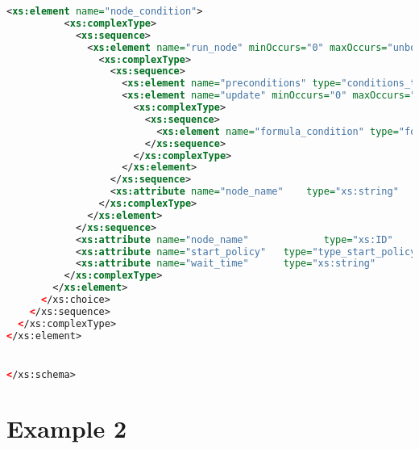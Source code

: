 \begin{lstlisting}[style=stylexml,language=XML]
        <xs:element name="node_condition">
          <xs:complexType>
            <xs:sequence>
              <xs:element name="run_node" minOccurs="0" maxOccurs="unbounded">
                <xs:complexType>
                  <xs:sequence>
                    <xs:element name="preconditions" type="conditions_type" minOccurs="1" maxOccurs="1" />
                    <xs:element name="update" minOccurs="0" maxOccurs="unbounded">
                      <xs:complexType>
                        <xs:sequence>
                          <xs:element name="formula_condition" type="formula_condition_type" minOccurs="1" maxOccurs="1" />
                        </xs:sequence>
                      </xs:complexType>
                    </xs:element>
                  </xs:sequence>
                  <xs:attribute name="node_name"    type="xs:string"   use="required"/>
                </xs:complexType>
              </xs:element>
            </xs:sequence>
            <xs:attribute name="node_name"             type="xs:ID"                use="required"/>
            <xs:attribute name="start_policy"   type="type_start_policy"    use="required"/>
            <xs:attribute name="wait_time"      type="xs:string"            use="optional"/>
          </xs:complexType>
        </xs:element>
      </xs:choice>
    </xs:sequence>
  </xs:complexType>
</xs:element>


</xs:schema>
	\end{lstlisting}
\chapter{  Example 2}\label{Appendix_3} 
